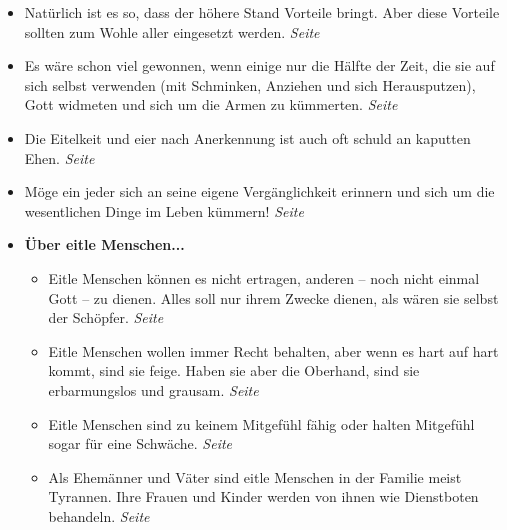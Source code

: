 \begin{itemize}
 \item Natürlich ist es so, dass der höhere Stand Vorteile bringt. Aber diese
Vorteile sollten zum Wohle aller eingesetzt werden.
 \dotfill \textit{Seite~\pageref{ref:11_07_standesvorteil}}\\

 \item Es wäre schon viel gewonnen, wenn einige nur die Hälfte der Zeit, die sie
auf sich selbst verwenden (mit Schminken, Anziehen und sich Herausputzen), Gott
widmeten und sich um die Armen zu kümmerten.
 \dotfill \textit{Seite~\pageref{ref:11_09_putzsucht}}\\

 \item Die Eitelkeit und eier nach Anerkennung ist auch oft schuld an
kaputten Ehen.
 \dotfill \textit{Seite~\pageref{ref:11_09_kaputte_ehen}}\\

 \item Möge ein jeder sich an seine eigene Vergänglichkeit erinnern und sich um
die wesentlichen Dinge im Leben kümmern!
 \dotfill \textit{Seite
\pageref{ref:11_10_juengstes_gericht}}\\

 \item \textbf{Über eitle Menschen...}

\begin{itemize}
 \item Eitle Menschen können es nicht ertragen, anderen -- noch nicht einmal Gott --
zu dienen. Alles soll nur ihrem Zwecke dienen, als wären sie selbst der
Schöpfer.
 \dotfill \textit{Seite~\pageref{ref:12_01_egoisten}}\\

 \item Eitle Menschen wollen immer Recht behalten, aber wenn es hart auf hart
kommt, sind sie feige. Haben sie aber die Oberhand, sind sie erbarmungslos und
grausam.
 \dotfill \textit{Seite~\pageref{ref:12_02_eitle_menschen_streit}}\\

 \item Eitle Menschen sind zu keinem Mitgefühl fähig oder halten Mitgefühl sogar
für eine Schwäche.
 \dotfill \textit{Seite~\pageref{ref:12_02_eitle_menschen_mitgefuehl}}\\

 \item Als Ehemänner und Väter sind eitle Menschen in der
Familie meist Tyrannen. Ihre Frauen und Kinder werden von ihnen wie Dienstboten behandeln.
 \dotfill \textit{Seite~\pageref{ref:12_03_eitle_menschen_ehe}}\\


\end{itemize}
\end{itemize}
